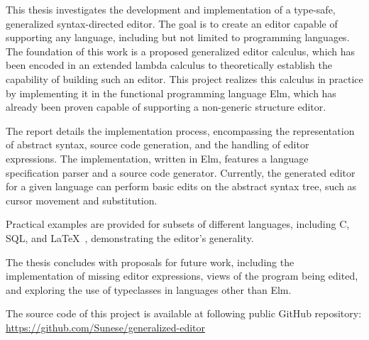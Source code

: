 This thesis investigates the development and implementation of a type-safe, generalized syntax-directed editor. The goal is to create an editor capable of supporting any language, including but not limited to programming languages. The foundation of this work is a proposed generalized editor calculus, which has been encoded in an extended lambda calculus to theoretically establish the capability of building such an editor. This project realizes this calculus in practice by implementing it in the functional programming language Elm, which has already
been proven capable of supporting a non-generic structure editor.

The report details the implementation process, encompassing the representation of abstract syntax, source code generation, and the handling of editor expressions. The implementation, written in Elm, features a language specification parser and a source code generator. Currently, the generated editor for a given language can perform basic edits on the abstract syntax tree, such as cursor movement and substitution.

Practical examples are provided for subsets of different languages, including C, SQL, and \LaTeX \ , demonstrating the editor's generality.

The thesis concludes with proposals for future work, including the implementation of missing editor expressions, views of the program being edited, and exploring the use of typeclasses in languages other than Elm.


The source code of this project is available at following public GitHub repository: \url{https://github.com/Sunese/generalized-editor}